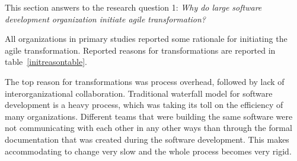This section answers to the research question 1: \textit{Why do large software development organization
initiate agile transformation?}

All organizations in primary studies reported some rationale
for initiating the agile transformation. Reported reasons for
transformations are reported in table~\ref{initreasontable}.

\bigskip
{
}
\bigbreak

The top reason for transformations was process overhead, followed by
lack of interorganizational collaboration. Traditional waterfall model
for software development is a heavy process, which was taking its toll
on the efficiency of many organizations. Different teams that were
building the same software were not communicating with each other in any
other ways than through the formal documentation that was created during
the software development. This makes accommodating to change very slow
and the whole process becomes very rigid.
